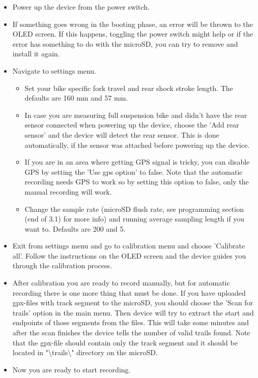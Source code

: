 \documentclass[a4paper,11pt]{article}
\begin{document}
\begin{itemize}
    \item Power up the device from the power switch.

    \item If something goes wrong in the booting phase, an error will be thrown to the OLED screen. If this happens, toggling the power switch might help or if the error has something to do with the microSD, you can try to remove and install it again.

    \item Navigate to settings menu. 
        \begin{itemize}
            \item Set your bike specific fork travel and rear shock stroke length. The defaults are 160 mm and 57 mm.
            \item In case you are measuring full suspension bike and didn't have the rear sensor connected when powering up the device, choose the 'Add rear sensor' and the device will detect the rear sensor. This is done automatically, if the sensor was attached before powering up the device.
            \item If you are in an area where getting GPS signal is tricky, you can disable GPS by setting the 'Use gps option' to false. Note that the automatic recording needs GPS to work so by setting this option to false, only the manual recording will work.
            \item Change the sample rate (microSD flush rate, see programming section (end of 3.1) for more info) and running average sampling length if you want to. Defaults are 200 and 5.
        \end{itemize}

        \item Exit from settings menu and go to calibration menu and choose 'Calibrate all'.  Follow the instructions on the OLED screen and the device guides you through the calibration process.

        \item After calibration you are ready to record manually, but for automatic recording there is one more thing that must be done. If you have uploaded gpx-files with track segment to the microSD, you should choose the 'Scan for trails' option in the main menu. Then device will try to extract the start and endpoints of those segments from the files. This will take some minutes and after the scan finishes the device tells the number of valid trails found. Note that the gpx-file should contain only the track segment and it should be located in "\textbackslash trails\textbackslash" directory on the microSD.

        \item Now you are ready to start recording.
\end{itemize}
\end{document}
